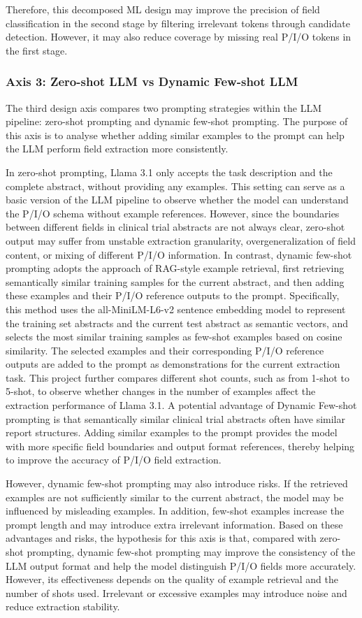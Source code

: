 \documentclass{article}
\begin{document}
Therefore, this decomposed ML design may improve the precision of field classification in the second stage by filtering irrelevant tokens through candidate detection. However, it may also reduce coverage by missing real P/I/O tokens in the first stage.

\subsubsection{Axis 3: Zero-shot LLM vs Dynamic Few-shot LLM}
The third design axis compares two prompting strategies within the LLM pipeline: zero-shot prompting and dynamic few-shot prompting. The purpose of this axis is to analyse whether adding similar examples to the prompt can help the LLM perform field extraction more consistently.


In zero-shot prompting, Llama 3.1 only accepts the task description and the complete abstract, without providing any examples. This setting can serve as a basic version of the LLM pipeline to observe whether the model can understand the P/I/O schema without example references. However, since the boundaries between different fields in clinical trial abstracts are not always clear, zero-shot output may suffer from unstable extraction granularity, overgeneralization of field content, or mixing of different P/I/O information. In contrast, dynamic few-shot prompting adopts the approach of RAG-style example retrieval, first retrieving semantically similar training samples for the current abstract, and then adding these examples and their P/I/O reference outputs to the prompt. Specifically, this method uses the all-MiniLM-L6-v2 sentence embedding model to represent the training set abstracts and the current test abstract as semantic vectors, and selects the most similar training samples as few-shot examples based on cosine similarity. The selected examples and their corresponding P/I/O reference outputs are added to the prompt as demonstrations for the current extraction task. This project further compares different shot counts, such as from 1-shot to 5-shot, to observe whether changes in the number of examples affect the extraction performance of Llama 3.1. A potential advantage of Dynamic Few-shot prompting is that semantically similar clinical trial abstracts often have similar report structures. Adding similar examples to the prompt provides the model with more specific field boundaries and output format references, thereby helping to improve the accuracy of P/I/O field extraction.


However, dynamic few-shot prompting may also introduce risks. If the retrieved examples are not sufficiently similar to the current abstract, the model may be influenced by misleading examples. In addition, few-shot examples increase the prompt length and may introduce extra irrelevant information. Based on these advantages and risks, the hypothesis for this axis is that, compared with zero-shot prompting, dynamic few-shot prompting may improve the consistency of the LLM output format and help the model distinguish P/I/O fields more accurately. However, its effectiveness depends on the quality of example retrieval and the number of shots used. Irrelevant or excessive examples may introduce noise and reduce extraction stability.
\end{document}
